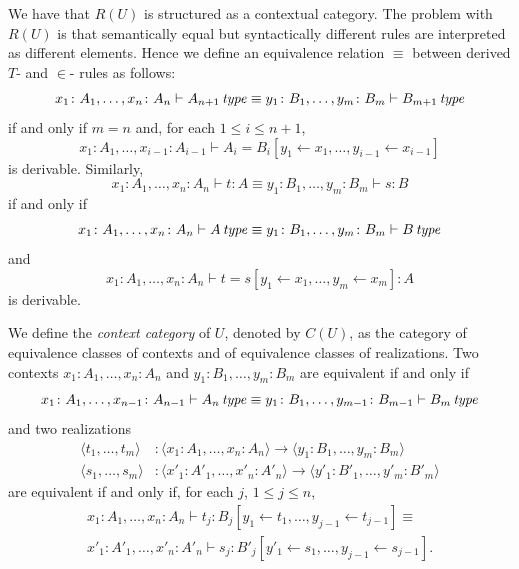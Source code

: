 We have that $R(U)$ is structured as a contextual category. The problem with $R(U)$ is that semantically equal 
but syntactically different rules are interpreted as different elements. Hence we define an equivalence
relation $\equiv$ between derived $T$- and $\in$- rules as follows:
\[
        x_1 \colon A_1, \dots, x_n \colon A_n
        \vdash
        A_{n+1} \operatorname{\mathit{\space type}}
    \equiv
        y_1 \colon B_1, \dots, y_m \colon B_m
        \vdash
        B_{m+1} \operatorname{\mathit{\space type}}
\]
if and only if $m = n$ and, for each $1 \leq i \leq n + 1$, \[
     x_1 \colon A_1, \dots, x_{i-1} \colon A_{i-1} \vdash A_i = B_i[y_1  \leftarrow  x_1, \dots, y_{i-1}  \leftarrow  x_{i-1}]
\] is derivable. Similarly,
\[
        x_1 \colon A_1, \dots, x_n \colon A_n 
        \vdash 
        t \colon A
    \equiv
        y_1 \colon B_1, \dots, y_m \colon B_m
        \vdash
        s \colon B
\]
if and only if \[
        x_1 \colon A_1, \dots, x_n \colon A_n
        \vdash
        A \operatorname{\mathit{\space type}}
    \equiv
        y_1 \colon B_1, \dots, y_m \colon B_m
        \vdash
        B \operatorname{\mathit{\space type}}
\] and \[ 
    x_1 \colon A_1, \dots, x_n \colon A_n 
    \vdash t = s[y_1  \leftarrow  x_1, \dots, y_m  \leftarrow  x_m] \colon A
\] is derivable.

We define the \textit{context category} of $U$, denoted by $C(U)$, as the category of equivalence classes of contexts and of equivalence
classes of realizations. Two contexts $x_1 \colon A_1, \dots, x_n \colon A_n$ and 
$y_1 \colon B_1, \dots, y_m \colon B_m$ are equivalent if and only if \[
        x_1 \colon A_1, \dots, x_{n-1} \colon A_{n-1}
        \vdash
        A_{n} \operatorname{\mathit{\space type}}
    \equiv
        y_1 \colon B_1, \dots, y_{m-1} \colon B_{m-1}
        \vdash
        B_{m} \operatorname{\mathit{\space type}}
\] and two realizations 
\begin{align*}
    \langle t_1, \dots, t_m \rangle 
        & \colon \langle x_1 \colon A_1, \dots, x_n \colon A_n \rangle
         \to  \langle y_1 \colon B_1, \dots, y_m \colon B_m \rangle \\
    \langle s_1, \dots, s_m \rangle
        & \colon \langle x'_1 \colon A'_1, \dots, x'_n \colon A'_n \rangle 
         \to \langle y'_1 \colon B'_1, \dots, y'_m \colon B'_m \rangle
\end{align*}
are equivalent if and only if, for each $j$, $1 \leq j \leq n$,
\begin{multline*}
     x_1 \colon A_1, \dots, x_n \colon A_n
        \vdash
        t_j \colon B_j[y_1  \leftarrow  t_1, \dots, y_{j-1}  \leftarrow  t_{j-1}]
    \equiv \\ 
        x'_1 \colon A'_1, \dots, x'_n \colon A'_n
        \vdash 
        s_j \colon B'_j[y'_1  \leftarrow  s_1, \dots, y_{j-1}  \leftarrow  s_{j-1}].
\end{multline*}

